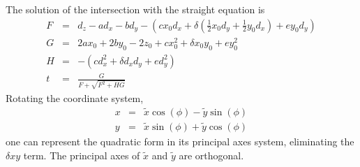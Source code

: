 \documentclass[12pt,a4paper,twoside,openright,BCOR10mm,headsepline,titlepage,abstracton,chapterprefix,final]{scrreprt}
\begin{document}
%
%
%
The solution of the intersection with the straight equation is
\begin{eqnarray}
 F &=& d_z - a d_x - b d_y - \left( c x_0 d_x + \delta \left( \frac{1}{2} x_0 d_y + \frac{1}{2} y_0 d_x \right)  + e y_0 d_y \right)   \\
 G &=&  2 a x_0 + 2 b y_0 - 2 z_0 + c x_0^2 + \delta x_0 y_0 + e y_0^2 \\
 H &=& - \left( c d_x^2 + \delta d_x d_y + e d_y^2 \right) \\
 t &=& \frac{G}{ F + \sqrt{F^2 + H G} }
\end{eqnarray}
Rotating the coordinate system,
\begin{eqnarray}
 x &=& \tilde{x} \cos(\phi) - \tilde{y} \sin(\phi) \\
 y &=& \tilde{x} \sin(\phi) + \tilde{y} \cos(\phi)
\end{eqnarray}
one can represent the quadratic form in its principal axes system, eliminating the $\delta x y$ term. 
The principal axes of $\tilde{x}$ and $\tilde{y}$ are orthogonal.
\end{document}
